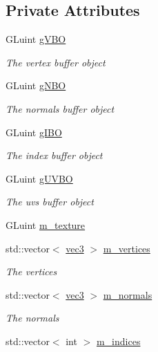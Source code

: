 \subsection*{Private Attributes}
\begin{DoxyCompactItemize}
\item 
G\+Luint \hyperlink{class_terrain_a3eeadcd1e1679c7e7b9abeb0246f186a}{g\+V\+BO}
\begin{DoxyCompactList}\small\item\em The vertex buffer object \end{DoxyCompactList}\item 
G\+Luint \hyperlink{class_terrain_a5ad7a9eeec86bdb40e4c124b1b889bd3}{g\+N\+BO}
\begin{DoxyCompactList}\small\item\em The normals buffer object \end{DoxyCompactList}\item 
G\+Luint \hyperlink{class_terrain_a5c60778885e518bb5081c2f85ab0146a}{g\+I\+BO}
\begin{DoxyCompactList}\small\item\em The index buffer object \end{DoxyCompactList}\item 
G\+Luint \hyperlink{class_terrain_aae611c939b8e3aad331745c9fb979dab}{g\+U\+V\+BO}
\begin{DoxyCompactList}\small\item\em The uvs buffer object \end{DoxyCompactList}\item 
G\+Luint \hyperlink{class_terrain_a25a5fe052a78f2a709b8f8ee8f349a6f}{m\+\_\+texture}
\item 
std\+::vector$<$ \hyperlink{_types_8h_a3d0ce73e3199de81565fb01632415288}{vec3} $>$ \hyperlink{class_terrain_aae8e29e9fa34cddbac685e2ab286cf90}{m\+\_\+vertices}
\begin{DoxyCompactList}\small\item\em The vertices \end{DoxyCompactList}\item 
std\+::vector$<$ \hyperlink{_types_8h_a3d0ce73e3199de81565fb01632415288}{vec3} $>$ \hyperlink{class_terrain_a36373bed2c1e63fa67f584ec16abc3da}{m\+\_\+normals}
\begin{DoxyCompactList}\small\item\em The normals \end{DoxyCompactList}\item 
std\+::vector$<$ int $>$ \hyperlink{class_terrain_a79132b320d28c77f4c7cb55b9f562631}{m\+\_\+indices}

\end{DoxyCompactItemize}
